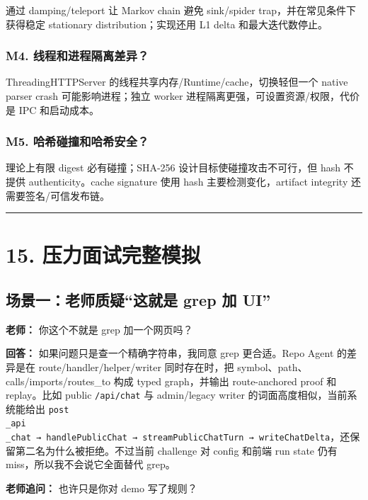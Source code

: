 \documentclass[UTF8,12pt,openany]{ctexbook}
\begin{document}
通过 damping/teleport 让 Markov chain 避免 sink/spider trap，并在常见条件下获得稳定 stationary distribution；实现还用 L1 delta 和最大迭代数停止。\par

\subsubsection{M4. 线程和进程隔离差异？}

ThreadingHTTPServer 的线程共享内存/Runtime/cache，切换轻但一个 native parser crash 可能影响进程；独立 worker 进程隔离更强，可设置资源/权限，代价是 IPC 和启动成本。\par

\subsubsection{M5. 哈希碰撞和哈希安全？}

理论上有限 digest 必有碰撞；SHA-256 设计目标使碰撞攻击不可行，但 hash 不提供 authenticity。cache signature 使用 hash 主要检测变化，artifact integrity 还需要签名/可信发布链。\par

\hrule

\section{15. 压力面试完整模拟}

\subsection{场景一：老师质疑“这就是 grep 加 UI”}

\textbf{老师：} 你这个不就是 grep 加一个网页吗？\par

\textbf{回答：} 如果问题只是查一个精确字符串，我同意 grep 更合适。Repo Agent 的差异是在 route/handler/helper/writer 同时存在时，把 symbol、path、calls/imports/routes\_to 构成 typed graph，并输出 route-anchored proof 和 replay。比如 public \texttt{/api/chat} 与 admin/legacy writer 的词面高度相似，当前系统能给出 \texttt{post\\_api\\_chat → handlePublicChat → streamPublicChatTurn → writeChatDelta}，还保留第二名为什么被拒绝。不过当前 challenge 对 config 和前端 run state 仍有 miss，所以我不会说它全面替代 grep。\par

\textbf{老师追问：} 也许只是你对 demo 写了规则？\par
\end{document}
